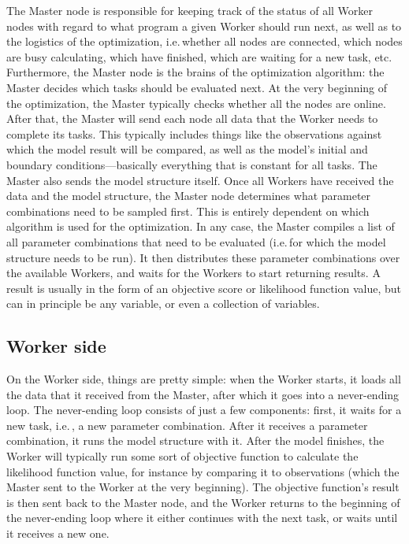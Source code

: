 The Master node is responsible for keeping track of the status of all Worker nodes with regard to what program a given Worker should run next, as well as to the logistics of the optimization, i.e.\,whether all nodes are connected, which nodes are busy calculating, which have finished, which are waiting for a new task, etc. Furthermore, the Master node is the brains of the optimization algorithm: the Master decides which tasks should be evaluated next. At the very beginning of the optimization, the Master typically checks whether all the nodes are online. After that, the Master will send each node all data that the Worker needs to complete its tasks. This typically includes things like the observations against which the model result will be compared, as well as the model's initial and boundary conditions---basically everything that is constant for all tasks. The Master also sends the model structure itself. Once all Workers have received the data and the model structure, the Master node determines what parameter combinations need to be sampled first. This is entirely dependent on which algorithm is used for the optimization. In any case, the Master compiles a list of all parameter combinations that need to be evaluated (i.e.\,for which the model structure needs to be run). It then distributes these parameter combinations over the available Workers, and waits for the Workers to start returning results. A result is usually in the form of an objective score or likelihood function value, but can in principle be any variable, or even a collection of variables.

\subsection{Worker side}


On the Worker side, things are pretty simple: when the Worker starts, it loads all the data that it received from the Master, after which it goes into a never-ending loop. The never-ending loop consists of just a few components: first, it waits for a new task, i.e.\,, a new parameter combination. After it receives a parameter combination, it runs the model structure with it. After the model finishes, the Worker will typically run some sort of objective function to calculate the likelihood function value, for instance by comparing it to observations (which the Master sent to the Worker at the very beginning). The objective function's result is then sent back to the Master node, and the Worker returns to the beginning of the never-ending loop where it either continues with the next task, or waits until it receives a new one.




